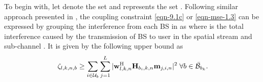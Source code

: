 To begin with, let  denote the set  and  represents the set . Following similar approach presented in \cite{pennanen2011decentralized,tolli2011decentralized}, the coupling constraint \eqref{eqn-9.1c} or \eqref{eqn-mse-1.3} can be expressed by grouping the interference from each \ac{BS} in  as
\iftoggle{single_column}{
\begin{IEEEeqnarray}{rCl}\label{eqn-decent-3}
\beta_{l,k,n} & \geq & \sum_{\substack{j = 1\\j \neq l}}^L |\mvec{w}{l,k,n}^\herm \mvec{H}{b_k,k,n} \mvec{m}{j,k,n} |^2 \nonumber \\
&\quad& + \sum_{i \in \mc{U}_{b_k} \backslash \{k\}} \sum_{j = 1}^L |\mvec{w}{l,k,n}^\herm \mvec{H}{b_k,k,n} \mvec{m}{j,i,n} |^2 + \sum_{b \in \bar{\mc{B}}_{b_k}} \zeta_{l,k,n,b} \; + \; \enoise
\end{IEEEeqnarray}}{\allowdisplaybreaks
\begin{multline}\label{eqn-decent-3}
	\enoise + \sum_{\substack{j = 1,j \neq l}}^L |\mvec{w}{l,k,n}^\herm \mvec{H}{b_k,k,n} \mvec{m}{j,k,n} |^2 + \sum_{b \in \bar{\mc{B}}_{b_k}} \zeta_{l,k,n,b}  \\
	+ \sum_{i \in \mc{U}_{b_k} \backslash \{k\}} \sum_{j = 1}^L |\mvec{w}{l,k,n}^\herm \mvec{H}{b_k,k,n} \mvec{m}{j,i,n} |^2 \leq \beta_{l,k,n}
\end{multline}}
where  is the total interference caused by the transmission of \ac{BS}  to user  in the spatial stream  and sub-channel . It is given by the following upper bound as
\begin{equation} \label{inter_exp}
\zeta_{l,k,n,b} \geq \sum_{i \in \mc{U}_b} \sum_{j = 1}^L |\mvec{w}{l,k,n}^\herm \mvec{H}{b_i,k,n} \mvec{m}{j,i,n} |^2 \; \forall b \in \bar{\mc{B}}_{b_k}.
\end{equation}

